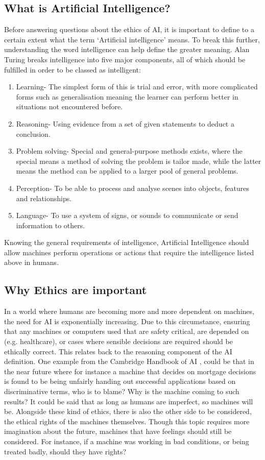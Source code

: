 \documentclass[article]{IEEEtran}
\begin{document}
\subsection{What is Artificial Intelligence?}
Before answering questions about the ethics of AI, it is important to define to a certain extent what the term ‘Artificial intelligence’ means. To break this further, understanding the word intelligence can help define the greater meaning. Alan Turing \cite{Alan Turing website} breaks intelligence into five major components, all of which should be fulfilled in order to be classed as intelligent:
\begin{enumerate}
\item Learning- The simplest form of this is trial and error, with more complicated forms such as generalisation meaning the learner can perform better in situations not encountered before.
\item Reasoning- Using evidence from a set of given statements to deduct a conclusion.
\item Problem solving- Special and general-purpose methods exists, where the special means a method of solving the problem is tailor made, while the latter means the method can be applied to a larger pool of general problems.	
\item Perception- To be able to process and analyse scenes into objects, features and relationships.
\item Language- To use a system of signs, or sounds to communicate or send information to others. 
\end{enumerate}
Knowing the general requirements of intelligence, Artificial Intelligence should allow machines perform operations or actions that require the intelligence listed above in humans.

\subsection{Why Ethics are important}
In a world where humans are becoming more and more dependent on machines, the need for AI is exponentially increasing. Due to this circumstance, ensuring that any machines or computers used that are safety critical, are depended on (e.g. healthcare), or cases where sensible decisions are required should be ethically correct. This relates back to the reasoning component of the AI definition. One example from the Cambridge Handbook of AI \cite{ethics important}, could be that in the near future where for instance a machine that decides  on mortgage decisions is found to be being unfairly handing out successful applications based on discriminative terms, who is to blame? Why is the machine coming to such results? It could be said that as long as humans are imperfect, so machines will be. 
Alongside these kind of ethics, there is also the other side to be considered, the ethical rights of the machines themselves. Though this topic requires more imagination about the future, machines that have feelings should still be considered. For instance, if a machine was working in bad conditions, or being treated badly, should they have rights?  
\end{document}
